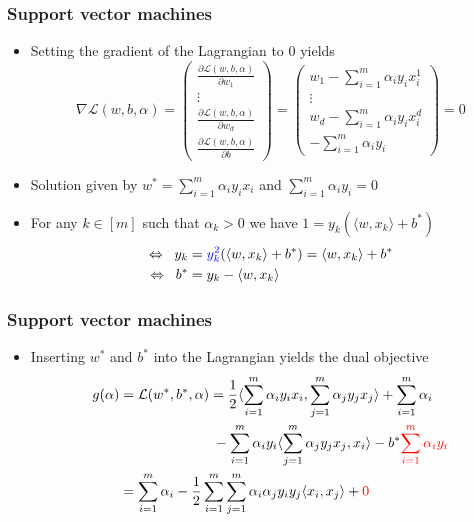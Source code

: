\documentclass[10pt]{beamer}
\begin{document}
\begin{frame}
  \frametitle{Support vector machines}
  \begin{itemize}
  \item Setting the gradient of the Lagrangian to 0 yields
  \[
	\nabla\mathcal{L}(w,b,\alpha) =
	\left(
	\begin{array}{c}
		\frac {\partial\mathcal{L}(w,b,\alpha)} {\partial w_1}\\
		\vdots \\
		\frac {\partial\mathcal{L}(w,b,\alpha)} {\partial w_d}\\[4pt]
		\frac {\partial\mathcal{L}(w,b,\alpha)} {\partial b}
	\end{array}
	\right) =
	\left(
	\begin{array}{c}
		w_1 - \sum_{i=1}^m \alpha_i y_i x_i^1\\
		\vdots \\
		w_d - \sum_{i=1}^m \alpha_i y_i x_i^d\\[4pt]
		- \sum_{i=1}^m \alpha_i y_i
	\end{array}
	\right) = 0
  \]
  \pause
  \item Solution given by $w^* = \sum_{i=1}^m \alpha_i y_i x_i$ and $\sum_{i=1}^m \alpha_i y_i = 0$
  \pause
  \item For any {\color{red} $k\in[m]$} such that {\color{red} $\alpha_k>0$} we have {\color{red} $1 = y_k(\langle w,x_k\rangle + b^*)$}
  \begin{align*}
	\Leftrightarrow \;\; y_k &= {\color{blue} y_k^2} (\langle w, x_k \rangle + b^*) = \langle w, x_k \rangle + b^*\\
	\Leftrightarrow \;\; b^* &= y_k - \langle w, x_k \rangle
  \end{align*}
  \end{itemize}
\end{frame}

\begin{frame}
  \frametitle{Support vector machines}
  \begin{itemize}
  \item Inserting $w^*$ and $b^*$ into the Lagrangian yields the dual objective
  \begin{align*}
	g(\alpha) &= \mathcal{L}(w^*,b^*,\alpha) = \frac 1 2 \langle \sum_{i=1}^m \alpha_i y_i x_i, \sum_{j=1}^m \alpha_j y_j x_j \rangle + \sum_{i=1}^m \alpha_i\\
	 & \hspace*{2.35cm} - \sum_{i=1}^m \alpha_i y_i \langle \sum_{j=1}^m \alpha_j y_j x_j, x_i\rangle - b^* {\color{red} \sum_{i=1}^m \alpha_i y_i}\\
	 &= \sum_{i=1}^m \alpha_i - \frac 1 2 \sum_{i=1}^m \sum_{j=1}^m \alpha_i \alpha_j y_i y_j \langle x_i, x_j \rangle + {\color{red} 0}
  \end{align*}
  \end{itemize}
\end{frame}
\end{document}
